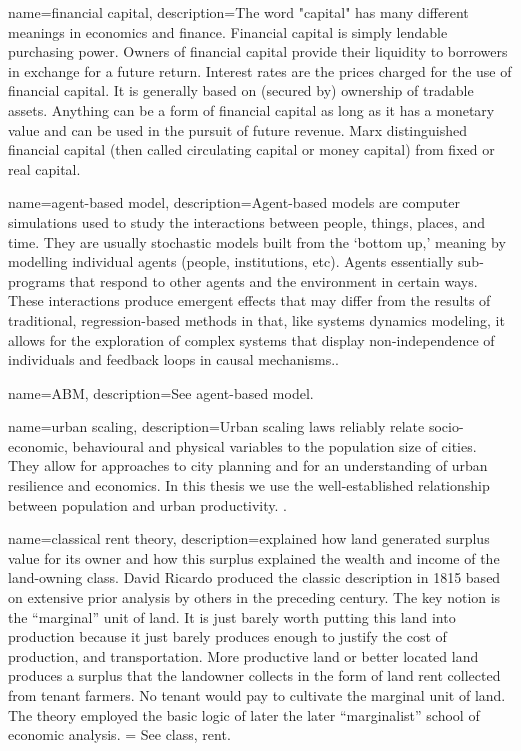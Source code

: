 {
name=financial capital,
description={The word "capital" has many different meanings in economics and finance. Financial capital is simply lendable purchasing power. Owners of financial capital provide their liquidity to borrowers in exchange for a future return. Interest rates are the prices charged for the use of financial capital. It is generally based on (secured by) ownership of tradable assets.  Anything can be a form of financial capital as long as it has a monetary value and can be  used in the pursuit of future revenue. Marx distinguished  financial capital (then called circulating capital or money capital) from fixed or real capital.   }
}

{
name=agent-based model,
description={Agent-based models are computer simulations used to study the interactions between people, things, places, and time. They are usually stochastic models built from the `bottom up,' meaning by modelling individual agents (people, institutions, etc). Agents essentially sub-programs that respond to other agents and the environment in certain ways. These interactions produce emergent effects that may differ from the results of traditional, regression-based methods in that, like systems dynamics modeling, it allows for the exploration of complex systems that display non-independence of individuals and feedback loops in causal mechanisms..}
}


{
name=ABM,
description={See \gls{agent-based model}.}
}


{
name=urban scaling,
description={Urban scaling laws reliably relate socio-economic, behavioural and physical variables to the population size of cities. They allow for approaches  to city planning and for an understanding of urban resilience and economics. In this thesis we use the well-established relationship between population and urban productivity. \cite{doi:10.1098/rsif.2020.0705}}. %
}


{
name=classical rent theory,
description={explained how land generated surplus value for its owner and how this surplus explained the wealth and income of the land-owning class. David Ricardo produced the classic description in 1815 based on extensive prior analysis by others in the preceding century. The key notion is the ``marginal'' unit of land. It is just barely worth putting this land into production because it just barely produces enough to justify the cost of production, and transportation. More productive land or better located land produces a surplus that the landowner  collects in the form of land rent collected from tenant farmers. No tenant would pay to cultivate the  marginal unit of land. The theory employed the basic logic of later the later ``marginalist''  school of economic analysis. = See \gls{class}, \gls{rent}.}
}

